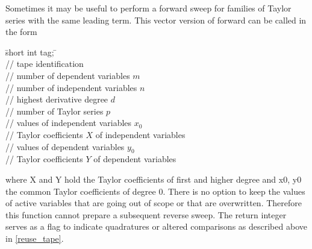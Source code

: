 \documentclass[11pt,twoside]{article}
\begin{document}
Sometimes it may be useful to perform a forward sweep for families of
Taylor series with the same leading term.
This vector version of {\sf forward} can be called in the form
%
\begin{tabbing}
\hspace{0.5in}\={\sf short int tag;} \hspace{1.1in}\= \kill    %
\\
         \> // tape identification \\
                 \> // number of dependent variables $m$\\
                 \> // number of independent variables $n$\\
                 \> // highest derivative degree $d$\\
                 \> // number of Taylor series $p$\\
          \> // values of independent variables $x_0$\\
     \> // Taylor coefficients $X$ of independent variables\\
           \> // values of dependent variables $y_0$\\
     \> // Taylor coefficients $Y$ of dependent variables
\end{tabbing}
%
where {\sf X} and {\sf Y} hold the Taylor coefficients of first
and higher degree and {\sf x0}, {\sf y0} the common Taylor coefficients of 
degree 0. There is no option to keep the values of active variables
that are going out of scope or that are overwritten. Therefore this
function cannot prepare a subsequent reverse sweep.
The return integer serves as a flag to indicate quadratures or altered
comparisons as described above in \autoref{reuse_tape}.
\end{document}
